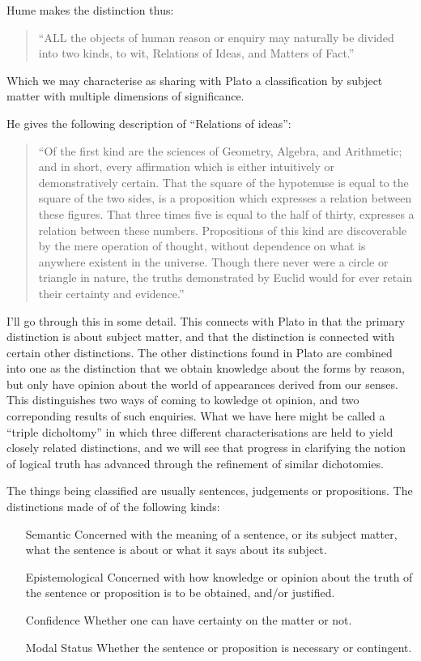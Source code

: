 \documentclass[10pt,titlepage]{article}
\begin{document}
Hume makes the distinction thus:

\begin{quote}
``ALL the objects of human reason or enquiry may naturally be divided
  into two kinds, to wit, Relations of Ideas, and Matters of Fact.'' 
\end{quote}

Which we may characterise as sharing with Plato a classification by subject matter with multiple dimensions of significance.

He gives the following description of ``Relations of ideas'':

\begin{quote}
``Of the first kind are the sciences of Geometry, Algebra, and
Arithmetic; and in short, every affirmation which is either
intuitively or demonstratively certain.
That the square of the hypotenuse is equal to the square of the two
sides, is a proposition which expresses a relation between these
figures.
That three times five is equal to the half of thirty, expresses a
relation between these numbers.
Propositions of this kind are discoverable by the mere operation of
thought, without dependence on what is anywhere existent in the
universe.
Though there never were a circle or triangle in nature, the truths
demonstrated by Euclid would for ever retain their certainty and
evidence.''
\end{quote}

I'll go through this in some detail.
This connects with Plato in that the primary distinction is about subject matter, and that the distinction is connected with certain other distinctions.
The other distinctions found in Plato are combined into one as the distinction that 
we obtain knowledge about the forms by reason, but only have opinion about the world of appearances derived from our senses.
This distinguishes two ways of coming to kowledge ot opinion, and two correponding results of such enquiries.
What we have here might be called a ``triple dicholtomy'' in which three different characterisations are held to yield closely related distinctions, and we will see that progress in clarifying the notion of logical truth has advanced through the refinement of similar dichotomies.

The things being classified are usually sentences, judgements or propositions.
The distinctions made of of the following kinds:
\begin{itemize}

\item[Semantic] Concerned with the meaning of a sentence, or its subject matter, what the sentence is about or what it says about its subject.
  
\item[Epistemological] Concerned with how knowledge or opinion about the truth of the sentence or proposition is to be obtained, and/or justified.

\item[Confidence] Whether one can have certainty on the matter or not.

\item[Modal Status] Whether the sentence or proposition is necessary or contingent.
  
\end{itemize}
\end{document}
